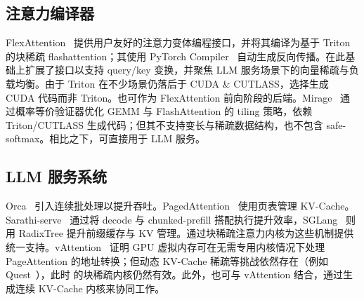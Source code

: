 \subsection{注意力编译器}

FlexAttention~\citep{he2024flexattention} 提供用户友好的注意力变体编程接口，并将其编译为基于 Triton~\citep{triton} 的块稀疏 flashattention；其使用 PyTorch Compiler~\citep{jason2024pytorch2} 自动生成反向传播。\sys 在此基础上扩展了接口以支持 query/key 变换，并聚焦 LLM 服务场景下的向量稀疏与负载均衡。由于 Triton 在不少场景仍落后于 CUDA \& CUTLASS，\sys 选择生成 CUDA 代码而非 Triton。\sys 也可作为 FlexAttention 前向阶段的后端。Mirage~\citep{wu2024mirage} 通过概率等价验证器优化 GEMM 与 FlashAttention 的 tiling 策略，依赖 Triton/CUTLASS 生成代码；但其不支持变长与稀疏数据结构，也不包含 safe-softmax。相比之下，\sys 可直接用于 LLM 服务。

\subsection{LLM 服务系统}

Orca~\citep{yu2022orca} 引入连续批处理以提升吞吐。PagedAttention~\citep{kwon2023vllm} 使用页表管理 KV-Cache。Sarathi-serve~\citep{agrawal2024sarathi} 通过将 decode 与 chunked-prefill 搭配执行提升效率，SGLang~\citep{zheng2023sglang} 则用 RadixTree 提升前缀缓存与 KV 管理。\sys 通过块稀疏注意力内核为这些机制提供统一支持。vAttention~\citep{prabhu2024vattention} 证明 GPU 虚拟内存可在无需专用内核情况下处理 PageAttention 的地址转换；但动态 KV-Cache 稀疏等挑战依然存在（例如 Quest~\citep{tang2024quest}），此时 \sys 的块稀疏内核仍然有效。此外，\sys 也可与 vAttention 结合，通过生成连续 KV-Cache 内核来协同工作。

